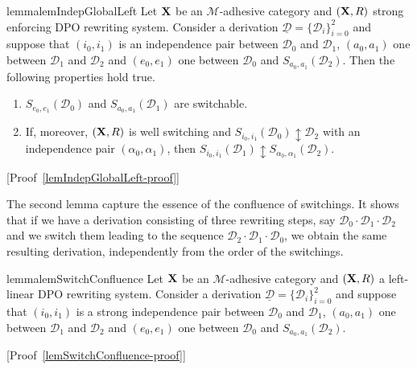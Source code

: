 \documentclass[a4paper,UKenglish,cleveref,pdftex,thm-restate,numberwithinsect,anonymous]{lipics}
\def\R{\mathsf{R}}
\def\X{\textbf {\textup{X}}}
\newcommand{\dder}[1]{\mathscr{#1}}
\newcommand{\der}[1]{\underline{\dder{#1}}}
\newcommand{\seqind}{\ensuremath{\updownarrow}}
\begin{document}
\begin{restatable}{lemma}{lemIndepGlobalLeft}
	\label{lem:indep-global-left}
	Let $\X$ be an $\mathcal{M}$-adhesive category and
	$(\X,\R)$ strong enforcing DPO rewriting system.
	Consider a derivation
	$\der{D}=\{\dder{D}_i\}_{i=0}^2$ and suppose that $(i_0,i_1)$ is an independence pair between $\dder{D}_0$ and $\dder{D}_1$,
	$(a_0,a_1)$ one between $\dder{D}_1$ and $\dder{D}_2$ and
	$(e_0, e_1)$ one between $\dder{D}_0$ and
	$S_{a_0,a_1}(\dder{D}_2)$. Then the following properties hold true.
	\begin{enumerate}
		\item
		\label{lem:indep-global-left:1}
		$S_{e_0,e_1}(\dder{D}_0)$ and $S_{a_0,a_1}(\dder{D}_1)$ are
		switchable.
		
		\item
		\label{lem:indep-global-left:2}
		If, moreover, $(\X, \R)$ is well switching and $S_{i_0, i_1}(\dder{D}_0)\seqind \dder{D}_2$ with an independence pair $(\alpha_0, \alpha_1)$, then
		$S_{i_0,i_1}(\dder{D}_1)\seqind S_{\alpha_0, \alpha_1}(\dder{D}_2)$.
	\end{enumerate}
\end{restatable}


[Proof~\ref{lemIndepGlobalLeft-proof}]


The second lemma capture the essence of the confluence of
switchings. It shows that if we have a derivation consisting of three
rewriting steps, say $\dder{D}_0\cdot \dder{D}_1\cdot  \dder{D}_2$ and we switch them leading to the
sequence $\dder{D}_2\cdot  \dder{D}_1\cdot  \dder{D}_0$, we obtain the same resulting derivation,
independently from the order of the switchings.


\begin{restatable}{lemma}{lemSwitchConfluence}
	\label{lem:switch-confluence}
	Let $\X$ be an $\mathcal{M}$-adhesive category and $(\X,\R)$ a
	left-linear DPO rewriting system.
	Consider a derivation $\der{D}=\{\dder{D}_i\}_{i=0}^2$ and suppose
	that $(i_0,i_1)$ is a strong independence pair between $\dder{D}_0$
	and $\dder{D}_1$, $(a_0,a_1)$ one between $\dder{D}_1$ and
	$\dder{D}_2$ and $(e_0, e_1)$ one between $\dder{D}_0$ and
	$S_{a_0,a_1}(\dder{D}_2)$.
\end{restatable}

[Proof~\ref{lemSwitchConfluence-proof}]
\end{document}
